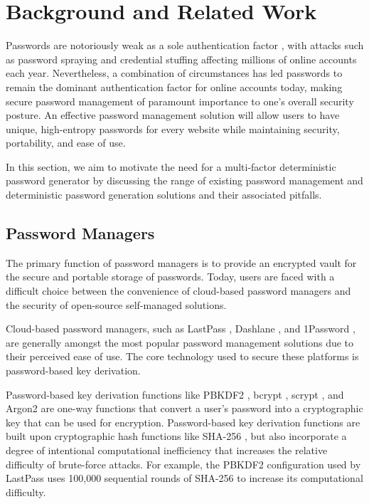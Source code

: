 \section{Background and Related Work}

Passwords are notoriously weak as a sole authentication factor \cite{password_reuse, florencio_large_2006}, with attacks such as password spraying \cite{spraying} and credential stuffing \cite{credential_stuffing} affecting millions of online accounts each year. Nevertheless, a combination of circumstances has led passwords to remain the dominant authentication factor for online accounts today, making secure password management of paramount importance to one's overall security posture. An effective password management solution will allow users to have unique, high-entropy passwords for every website while maintaining security, portability, and ease of use.

In this section, we aim to motivate the need for a multi-factor deterministic password generator by discussing the range of existing password management and deterministic password generation solutions and their associated pitfalls.

\subsection{Password Managers}

The primary function of password managers is to provide an encrypted vault for the secure and portable storage of passwords. Today, users are faced with a difficult choice between the convenience of cloud-based password managers and the security of open-source self-managed solutions.

Cloud-based password managers, such as LastPass \cite{lastpass_arch}, Dashlane \cite{dashlane_arch}, and 1Password \cite{1password_arch}, are generally amongst the most popular password management solutions due to their perceived ease of use. The core technology used to secure these platforms is password-based key derivation.

Password-based key derivation functions like PBKDF2 \cite{rfc2898}, bcrypt \cite{bcrypt}, scrypt \cite{scrypt}, and Argon2 \cite{argon2} are one-way functions that convert a user's password into a cryptographic key that can be used for encryption.
Password-based key derivation functions are built upon cryptographic hash functions like SHA-256 \cite{rfc6234}, but also incorporate a degree of intentional computational inefficiency that increases the relative difficulty of brute-force attacks. For example, the PBKDF2 configuration used by LastPass uses 100,000 sequential rounds of SHA-256 to increase its computational difficulty.

